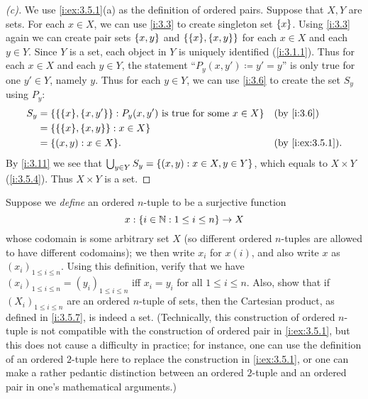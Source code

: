 \begin{proof}[(c)]
  We use \cref{i:ex:3.5.1}(a) as the definition of ordered pairs.
  Suppose that \(X, Y\) are sets.
  For each \(x \in X\), we can use \cref{i:3.3} to create singleton set \(\left\lbrace x\right\rbrace\).
  Using \cref{i:3.3} again we can create pair sets \(\left\lbrace x, y\right\rbrace\) and \(\set{\set{x}, \set{x, y}}\) for each \(x \in X\) and each \(y \in Y\).
  Since \(Y\) is a set, each object in \(Y\) is uniquely identified (\cref{i:3.1.1}).
  Thus for each \(x \in X\) and each \(y \in Y\), the statement ``\(P_y(x, y') \coloneqq y' = y\)'' is only true for one \(y' \in Y\), namely \(y\).
  Thus for each \(y \in Y\), we can use \cref{i:3.6} to create the set \(S_y\) using \(P_y\):
  \begin{align*}
    S_y & = \set{\set{\set{x}, \set{x, y'}} : P_y(x, y') \text{ is true for some } x \in X} &  & \by{i:3.6}       \\
        & = \set{\set{\set{x}, \set{x, y}} : x \in X}                                                             \\
        & = \set{(x, y) : x \in X}.                                                         &  & \by{i:ex:3.5.1}.
  \end{align*}
  By \cref{i:3.11} we see that \(\bigcup_{y \in Y} S_y = \left\lbrace(x, y) : x \in X, y \in Y\right\rbrace\), which equals to \(X \times Y\) (\cref{i:3.5.4}).
  Thus \(X \times Y\) is a set.
\end{proof}

\begin{ex}\label{i:ex:3.5.2}
  Suppose we \emph{define} an ordered \(n\)-tuple to be a surjective function
  \[
    x : \left\lbrace i \in \mathbb{N} : 1 \leq i \leq n\right\rbrace \to X
  \]
  whose codomain is some arbitrary set \(X\) (so different ordered \(n\)-tuples are allowed to have different codomains);
  we then write \(x_i\) for \(x(i)\), and also write \(x\) as \((x_i)_{1 \leq i \leq n}\).
  Using this definition, verify that we have \((x_i)_{1 \leq i \leq n} = (y_i)_{1 \leq i \leq n}\) iff \(x_i = y_i\) for all \(1 \leq i \leq n\).
  Also, show that if \((X_i)_{1 \leq i \leq n}\) are an ordered \(n\)-tuple of sets, then the Cartesian product, as defined in \cref{i:3.5.7}, is indeed a set.
  (Technically, this construction of ordered \(n\)-tuple is not compatible with the construction of ordered pair in \cref{i:ex:3.5.1}, but this does not cause a difficulty in practice;
  for instance, one can use the definition of an ordered \(2\)-tuple here to replace the construction in \cref{i:ex:3.5.1}, or one can make a rather pedantic distinction between an ordered \(2\)-tuple and an ordered pair in one's mathematical arguments.)
\end{ex}

